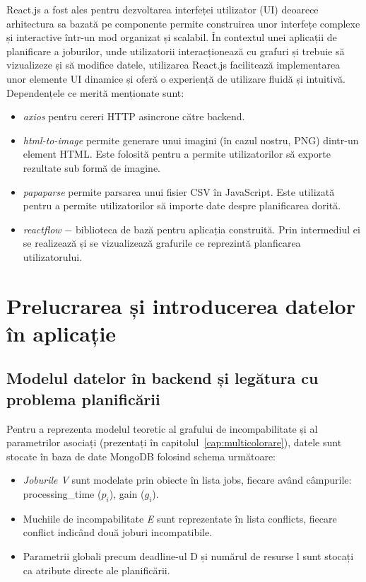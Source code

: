 React.js a fost ales pentru dezvoltarea interfeței utilizator (UI) deoarece arhitectura sa bazată pe componente permite construirea unor interfețe complexe și interactive într-un mod organizat și scalabil. În contextul unei aplicații de planificare a joburilor, unde utilizatorii interacționează cu grafuri și trebuie să vizualizeze și să modifice datele, utilizarea React.js facilitează implementarea unor elemente UI dinamice și oferă o experiență de utilizare fluidă și intuitivă.
Dependențele ce merită menționate sunt:
\begin{itemize}
  \item \textit{axios} pentru cereri HTTP asincrone către backend.
  \item \textit{html-to-image} permite generare unui imagini (în cazul nostru, PNG) dintr-un element HTML. Este folosită pentru a permite utilizatorilor să exporte rezultate sub formă de imagine.
  \item \textit{papaparse} permite parsarea unui fisier CSV în JavaScript. Este utilizată pentru a permite utilizatorilor să importe date despre planificarea dorită.
  \item \textit{reactflow} $-$ biblioteca de bază pentru aplicația construită. Prin intermediul ei se realizează și se vizualizează grafurile ce reprezintă planficarea utilizatorului.
\end{itemize}


\section{ Prelucrarea și introducerea datelor în aplicație}
\subsection{Modelul datelor în backend și legătura cu problema planificării}

Pentru a reprezenta modelul teoretic al grafului de incompabilitate și al parametrilor asociați (prezentați în capitolul~\ref{cap:multicolorare}), datele sunt stocate în baza de date MongoDB folosind schema următoare:
\begin{itemize}
  \item \textit{Joburile V} sunt modelate prin obiecte în lista jobs, fiecare având câmpurile: processing\_time ($p_i$), gain ($g_i$).
  \item Muchiile de incompabilitate \textit{E} sunt reprezentate în lista conflicts, fiecare conflict indicând două joburi incompatibile.
  \item Parametrii globali precum deadline-ul D și numărul de resurse l sunt stocați ca atribute directe ale planificării.
\end{itemize} 

